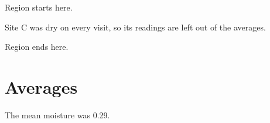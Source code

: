 \documentclass[11pt]{article}
\begin{document}
Region starts here.

Site C\dag{} was dry on every visit, so its readings are left out of the averages.

Region ends here.

\section{Averages}
The mean moisture was 0.29.
\end{document}
